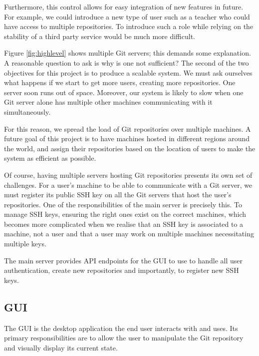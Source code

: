 Furthermore, this control allows for easy integration of new features in future. For example, we could introduce a new type of user such as a teacher who could have access to multiple repositories. To introduce such a role while relying on the stability of a third party service would be much more difficult.

Figure \ref{fig:highlevel} shows multiple Git servers; this demands some explanation. A reasonable question to ask is why is one not sufficient? The second of the two objectives for this project is to produce a scalable system. We must ask ourselves what happens if we start to get more users, creating more repositories. One server soon runs out of space. Moreover, our system is likely to slow when one Git server alone has multiple other machines communicating with it simultaneously.

For this reason, we spread the load of Git repositories over multiple machines. A future goal of this project is to have machines hosted in different regions around the world, and assign their repositories based on the location of users to make the system as efficient as possible.

Of course, having multiple servers hosting Git repositories presents its own set of challenges. For a user's machine to be able to communicate with a Git server, we must register its public SSH key on all the Git servers that host the user's repositories. One of the responsibilities of the main server is precisely this. To manage SSH keys, ensuring the right ones exist on the correct machines, which becomes more complicated when we realise that an SSH key is associated to a machine, not a user and that a user may work on multiple machines necessitating multiple keys.

The main server provides API endpoints for the GUI to use to handle all user authentication, create new repositories and importantly, to register new SSH keys.

\subsection{GUI}

The GUI is the desktop application the end user interacts with and uses. Its primary responsibilities are to allow the user to manipulate the Git repository and visually display its current state.

